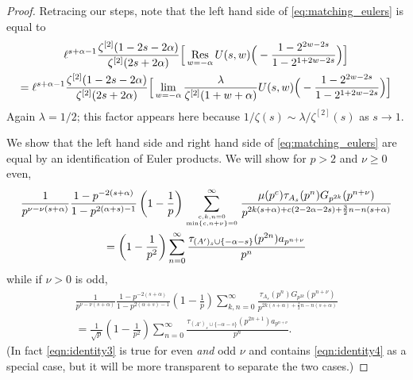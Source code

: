 \documentclass[12pt]{amsart}
\begin{document}
	\begin{proof}
		Retracing our steps, note that the left hand side of \eqref{eq:matching_eulers} is equal to
		\begin{multline}
			\label{eq:back_to_U(s,w)}
			\ell^{s+\alpha-1}\frac{ \zeta^{[2]}(1-2s-2\alpha)}{\zeta^{[2]}(2s+2\alpha)} \Big[ \operatornamewithlimits{Res}_{w = -\alpha} U(s,w) \Big(-\frac{1-2^{2w-2s}}{1-2^{1+2w-2s}}\Big)\Big] \\
			= \ell^{s+\alpha-1}\frac{ \zeta^{[2]}(1-2s-2\alpha)}{\zeta^{[2]}(2s+2\alpha)} \Big[ \lim_{w = -\alpha} \frac{\lambda}{\zeta^{[2]}(1+w+\alpha)} U(s,w) \Big(-\frac{1-2^{2w-2s}}{1-2^{1+2w-2s}}\Big)\Big]
		\end{multline}
		Again $\lambda = 1/2$; this factor appears here because $1/\zeta(s) \sim \lambda/\zeta^{[2]}(s)$ as $s\rightarrow 1$.
		
		We show that the left hand side and right hand side of \eqref{eq:matching_eulers} are equal by an identification of Euler products. We will show for $p > 2$ and $\nu \geq 0$ even,
		\begin{multline} \label{eqn:identity3}
			\frac{1}{p^{\nu-\nu(s+ \alpha)}} \frac{1-p^{-2(s+\alpha)}}{1-p^{2(\alpha+s)-1}} \left(1-\frac 1 p\right)
			\sum_{c,k,n=0\atop \min\{c,n+\nu\}=0}^\infty \frac{\mu(p^c)\tau_{A_s}(p^n)G_{p^{2k}}(p^{n+\nu})} {p^{2k (s+\alpha)+c(2-2\alpha-2s)+\frac 32 n-n(s+\alpha)}}\\
			=\left(1-\frac{1}{p^2}\right) 
			\sum_{n=0}^\infty \frac{\tau_{(A')_s\cup\{-\alpha-s\}}(p^{2n})a_{p^{n+\nu}}  } {p^{n}}
		\end{multline}
		while if $\nu>0$ is odd,
		\begin{multline} \label{eqn:identity4} \frac{1}{p^{\nu-\nu (s+\alpha)}} \frac{1-p^{-2(s+\alpha)}}{1-p^{2(\alpha+s)-1}}\left(1-\frac 1 p\right)
			\sum_{k,n=0}^\infty \frac{\tau_{A_s}(p^n)G_{p^{2k}}(p^{n+\nu})}{p^{2k (s+\alpha)+\frac 3 2 n-n (s+\alpha) }}\\
			=\frac 1 {\sqrt{p}}\left(1-\frac{1}{p^2}\right) 
			\sum_{n=0}^\infty \frac{\tau_{(A')_s\cup\{-\alpha-s\}}(p^{2n+1})a_{p^{n+\nu}} }{p^{n}}.
		\end{multline}
		(In fact \eqref{eqn:identity3} is true for even \emph{and} odd $\nu$ and contains \eqref{eqn:identity4} as a special case, but it will be more transparent to separate the two cases.)
		

\end{proof}
\end{document}
